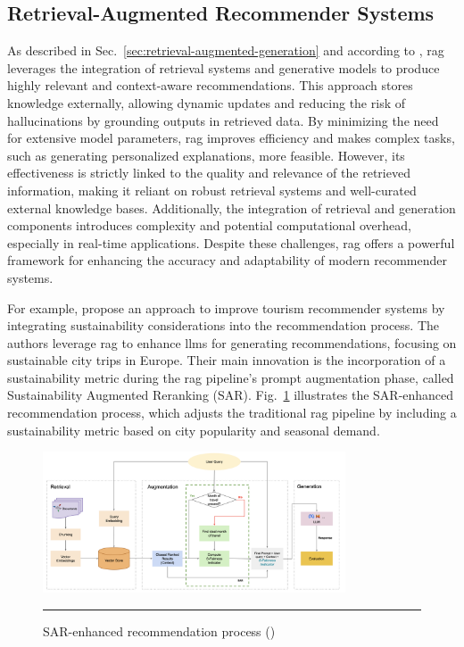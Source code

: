 \subsection*{Retrieval-Augmented Recommender Systems}\label{sec:retrieval-augmented-recommender-systems-in-research-field}

As described in Sec.~\ref{sec:retrieval-augmented-generation} and according to \textcite{Deldjoo2024}, \gls{rag} leverages the integration of retrieval systems and generative models to produce highly relevant and context-aware recommendations.
This approach stores knowledge externally, allowing dynamic updates and reducing the risk of hallucinations by grounding outputs in retrieved data.
By minimizing the need for extensive model parameters, \gls{rag} improves efficiency and makes complex tasks, such as generating personalized explanations, more feasible.
However, its effectiveness is strictly linked to the quality and relevance of the retrieved information, making it reliant on robust retrieval systems and well-curated external knowledge bases.
Additionally, the integration of retrieval and generation components introduces complexity and potential computational overhead, especially in real-time applications.
Despite these challenges, \gls{rag} offers a powerful framework for enhancing the accuracy and adaptability of modern recommender systems.

For example, \textcite{Banerjee2024} propose an approach to improve tourism recommender systems by integrating sustainability considerations into the recommendation process.
The authors leverage \gls{rag} to enhance \glspl{llm} for generating recommendations, focusing on sustainable city trips in Europe.
Their main innovation is the incorporation of a sustainability metric during the \gls{rag} pipeline's prompt augmentation phase, called Sustainability Augmented Reranking (SAR).
Fig.~\ref{fig:sar-enhanced-recommendation} illustrates the SAR-enhanced recommendation process, which adjusts the traditional \gls{rag} pipeline by including a sustainability metric based on city popularity and seasonal demand.

\begin{figure}[htbp]
    \centering
    \includegraphics[width=0.8\textwidth]{figures/literature-review/rag-tourism.png}
    \rule{35em}{0.5pt}
    \caption{SAR-enhanced recommendation process (\textcite{Banerjee2024})}
 \label{fig:sar-enhanced-recommendation}
\end{figure}

